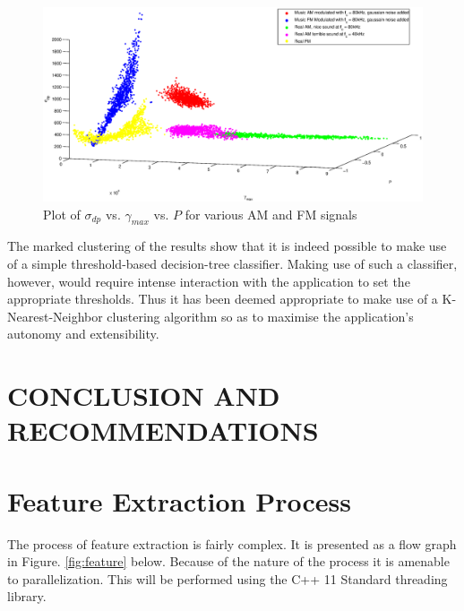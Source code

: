 \documentclass[10pt,twocolumn]{witseiepaper}
\begin{document}
	\begin{figure}[!h]
		\centering
		\includegraphics[width=1.1\textwidth]{plot0.eps}
		\caption{Plot of $\sigma_{dp}$ vs. $\gamma_{max}$ vs. $P$ for various AM and FM signals}
		\label{fig:plot0}
	\end{figure}

	The marked clustering of the results show that it is indeed possible to make use of a simple threshold-based decision-tree classifier. Making use of such a classifier, however, would require intense interaction with the application to set the appropriate thresholds. Thus it has been deemed appropriate to make use of a K-Nearest-Neighbor clustering algorithm so as to maximise the application's autonomy and extensibility.


\section{CONCLUSION AND RECOMMENDATIONS}


 

\onecolumn
\appendix
\setcounter{figure}{0}
\section{Feature Extraction Process}
\label{app:feature}
The process of feature extraction is fairly complex. It is presented as a flow graph in Figure. \ref{fig:feature} below. Because of the nature of the process it is amenable to parallelization. This will be performed using the C++ 11 Standard threading library.
\end{document}

